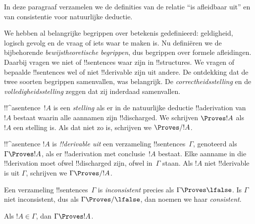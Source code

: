 \documentclass[../../../include/open-logic-section]{subfiles}
\begin{document}
      {}
      {}


\begin{editorial}
In deze paragraaf verzamelen we de definities van de relatie
``is afleidbaar uit'' en van consistentie voor natuurlijke deductie.
\end{editorial}

\begin{explain}
We hebben al belangrijke begrippen over betekenis gedefinieerd:
geldigheid, logisch gevolg en de vraag of iets waar te maken is. Nu
definiëren we de bijbehorende \emph{bewijstheoretische begrippen},
dus begrippen over formele afleidingen. Daarbij vragen we niet of
!!{sentence}s waar zijn in !!{structure}s. We vragen of bepaalde
!!{sentence}s wel of niet !!{derivable} zijn uit andere. De ontdekking
dat de twee soorten begrippen samenvallen, was belangrijk. De
\emph{correctheidsstelling} en de \emph{volledigheidsstelling} zeggen
dat zij
inderdaad samenvallen.
\end{explain}


\begin{defn}[Stellingen]
!!^a{sentence}~$!A$ is een \emph{stelling} als er in de natuurlijke
deductie !!a{derivation} van~$!A$ bestaat waarin alle aannamen zijn
!!{discharged}. We schrijven $\Proves !A$ als $!A$ een stelling is.
Als dat niet zo is, schrijven we $\Proves/ !A$.
\end{defn}

\begin{defn}[!!^{derivability}]
!!^a{sentence} $!A$ is \emph{!!{derivable} uit} een verzameling
!!{sentence}s~$\Gamma$, genoteerd als $\Gamma \Proves !A$, als er
!!a{derivation} met conclusie~$!A$ bestaat. Elke aanname in die
!!{derivation} moet ofwel !!{discharged} zijn, ofwel in~$\Gamma$
staan. Als $!A$ niet !!{derivable} is uit $\Gamma$, schrijven we
$\Gamma \Proves/ !A$.
\end{defn}

\begin{defn}[Consistentie]
Een verzameling !!{sentence}s~$\Gamma$ is \emph{inconsistent} precies
als $\Gamma \Proves \lfalse$. Is $\Gamma$ niet inconsistent, dus als
$\Gamma \Proves/ \lfalse$, dan noemen we haar \emph{consistent}.
\end{defn}

\begin{prop}[Reflexiviteit]
Als $!A \in \Gamma$, dan $\Gamma \Proves !A$.
\end{prop}
\end{document}
